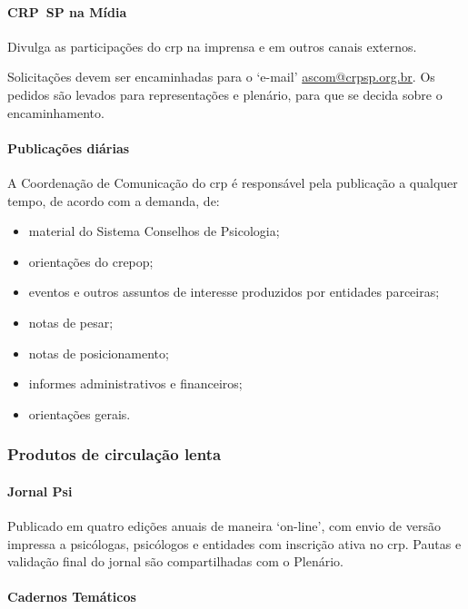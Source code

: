 \paragraph{CRP~SP na Mídia}

Divulga as participações do \ac{crp} na imprensa e em outros canais externos.

Solicitações devem ser encaminhadas para o `e-mail' \href{mailto:ascom@crpsp.org.br}{ascom@crpsp.org.br}. Os pedidos são levados para representações e plenário, para que se decida sobre o encaminhamento.

\paragraph{Publicações diárias}

A Coordenação de Comunicação do \ac{crp} é responsável pela publicação a qualquer tempo, de acordo com a demanda, de:

\begin{itemize}
	\item
	material do Sistema Conselhos de Psicologia;
	\item
	orientações do \ac{crepop};
	\item
	eventos e outros assuntos de interesse produzidos por entidades parceiras;
	\item
	notas de pesar;
	\item
	notas de posicionamento;
	\item
	informes administrativos e financeiros;
	\item
	orientações gerais.
\end{itemize}

\subsubsection{Produtos de circulação lenta}

\paragraph{Jornal Psi}

Publicado em quatro edições anuais de maneira `on-line', com envio de versão impressa a psicólogas, psicólogos e entidades com inscrição ativa no \ac{crp}. Pautas e validação final do jornal são compartilhadas com o Plenário.

\paragraph{Cadernos Temáticos}

